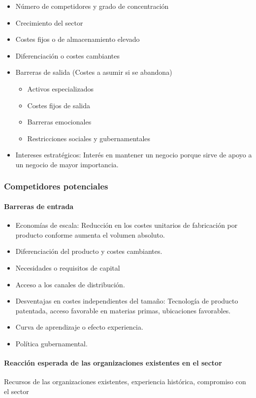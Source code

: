\documentclass[12pt]{article}
\theoremstyle{definition_wo_parentheses}
\begin{document}
\begin{itemize}
\item Número de competidores y grado de concentración
\item Crecimiento del sector
\item Costes fijos o de almacenamiento elevado 
\item Diferenciación o costes cambiantes
\item Barreras de salida (Costes a asumir si se abandona)
	\begin{itemize}
	\item Activos especializados
	\item Costes fijos de salida
	\item Barreras emocionales
	\item Restricciones sociales y gubernamentales
	\end{itemize}
\item Intereses estratégicos: Interés en mantener un negocio porque sirve de apoyo a un negocio de mayor importancia.

\end{itemize}

\subsubsection{Competidores potenciales}

\paragraph{Barreras de entrada}
\begin{itemize}
\item Economías de escala: Reducción en los costes unitarios de fabricación por producto conforme aumenta el volumen absoluto.
\item Diferenciación del producto y costes cambiantes.
\item Necesidades o requisitos de capital
\item Acceso a los canales de distribución.
\item Desventajas en costes independientes del tamaño: Tecnología de producto patentada, acceso favorable en materias primas, ubicaciones favorables.
\item Curva de aprendizaje o efecto experiencia. 
\item Política gubernamental.
\end{itemize}

\paragraph{Reacción esperada de las organizaciones existentes en el sector} Recursos de las organizaciones existentes, experiencia histórica, compromiso con el sector
\end{document}
